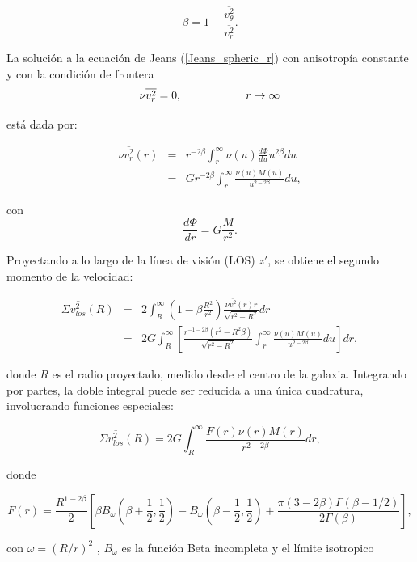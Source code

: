$$\beta = 1- \frac{ \overline{ v_{\theta}^2 } }{ \overline{ v_r^2 } }. $$

La solución a la ecuación de Jeans (\ref{Jeans_spheric_r}) con anisotropía constante y con la condición de frontera
$$ \nu \overline{ v_r^2 } = 0, \hspace{2 cm} r \rightarrow \infty $$

está dada por:

\begin{eqnarray}
\nu \overline{ v_r^2 } (r) &=& r^{-2\beta} \int_r^{\infty} \nu(u) \frac{d\Phi}{du} u^{2\beta} du \\
 &=& G r^{-2\beta} \int_r^{\infty} \frac{\nu(u) M(u) }{ u^{2-2\beta} } du,
\end{eqnarray}

con $$ \frac{d\Phi}{dr} = G \frac{M}{r^2}. $$

Proyectando a lo largo de la línea de visión (LOS) $z'$, se obtiene el segundo momento de la velocidad:

\begin{eqnarray}
\Sigma \overline{v_{los}^2} (R) &=& 2 \int_R^{\infty} \left (  1-\beta \frac{R^2}{r^2}  \right ) \frac{\nu \overline{ v_r^2 }(r) r }{ \sqrt{r^2 - R^2} } dr \\
 &=& 2G \int_R^{\infty} \left [  \frac{r^{-1-2\beta}(r^2-R^2\beta) }{\sqrt{r^2 - R^2} }  \int_r^{\infty} \frac{\nu(u) M(u) }{ u^{2-2\beta} } du \right ] dr,
\end{eqnarray}

donde $R$ es el radio proyectado, medido desde el centro de la galaxia. Integrando por partes, la doble integral puede ser reducida a una única cuadratura, involucrando funciones especiales:

\begin{equation}
\label{sigma_los_spherical}
\Sigma \overline{v_{los}^2} (R) = 2G \int_R^{\infty} \frac{ F(r) \nu(r) M(r) }{ r^{2-2\beta} } dr,
\end{equation}

donde

\begin{equation}
\label{F_r}
F(r) = \frac{R^{1-2\beta}}{2} \left [ \beta B_{\omega} \left( \beta + \frac{1}{2}, \frac{1}{2} \right)-B_{\omega} \left( \beta - \frac{1}{2}, \frac{1}{2} \right) +\frac{ \pi(3-2\beta) \Gamma (\beta - 1/2) }{ 2\Gamma (\beta) }  \right ],
\end{equation}

con $\omega = (R/r)^2$ , $B_{\omega} $ es la función Beta incompleta y el límite isotropico

